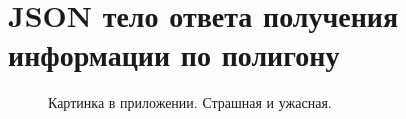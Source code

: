 \chapter{JSON тело ответа получения информации по полигону}
\label{cha:polygon}

\begin{figure}
	\centering
	\caption{Картинка в приложении. Страшная и ужасная.}
\end{figure}